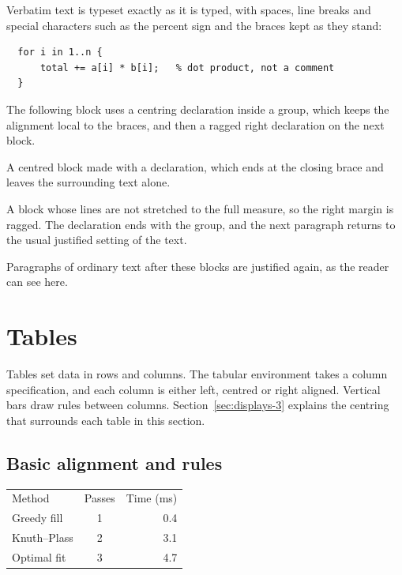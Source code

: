 \documentclass{article}
\begin{document}
Verbatim text is typeset exactly as it is typed, with spaces, line breaks and special
characters such as the percent sign and the braces kept as they stand:

\begin{verbatim}
  for i in 1..n {
      total += a[i] * b[i];   % dot product, not a comment
  }
\end{verbatim}

The following block uses a centring declaration inside a group, which keeps the
alignment local to the braces, and then a ragged right declaration on the next block.

{\centering A centred block made with a declaration, which ends at the closing
brace and leaves the surrounding text alone.\par}

{\raggedright A block whose lines are not stretched to the full measure, so the
right margin is ragged. The declaration ends with the group, and the next paragraph
returns to the usual justified setting of the text.\par}

Paragraphs of ordinary text after these blocks are justified again, as the reader can
see here.

\section{Tables}\label{sec:tables-3}

Tables set data in rows and columns. The tabular environment takes a column
specification, and each column is either left, centred or right aligned. Vertical bars
draw rules between columns. Section~\ref{sec:displays-3} explains the centring that surrounds each table in
this section.

\subsection{Basic alignment and rules}\label{sec:tables-basic-3}

\begin{center}
\begin{tabular}{l c r}
Method & Passes & Time (ms) \\
Greedy fill      & 1 & 0.4 \\
Knuth--Plass     & 2 & 3.1 \\
Optimal fit      & 3 & 4.7 \\
\end{tabular}
\end{center}
\end{document}
